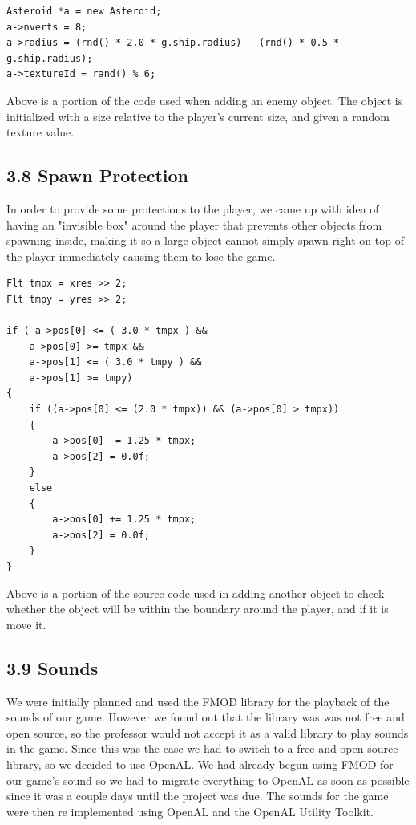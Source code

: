 \documentclass[12pt]{report}
\begin{document}
\begin{lstlisting}
Asteroid *a = new Asteroid;
a->nverts = 8;
a->radius = (rnd() * 2.0 * g.ship.radius) - (rnd() * 0.5 * g.ship.radius);
a->textureId = rand() % 6;
\end{lstlisting}

\noindent Above is a portion of the code used when adding an enemy object. The object is initialized with a size relative to the player's current size, and given a random texture value.

\newpage
\subsection*{3.8 Spawn Protection}
In order to provide some protections to the player, we came up with idea of having an "invisible box" around the player that prevents other objects from spawning inside, making it so a large object cannot simply spawn right on top of the player immediately causing them to lose the game. \bigskip

\begin{lstlisting}
Flt tmpx = xres >> 2;
Flt tmpy = yres >> 2;

if ( a->pos[0] <= ( 3.0 * tmpx ) &&
	a->pos[0] >= tmpx &&
	a->pos[1] <= ( 3.0 * tmpy ) &&
	a->pos[1] >= tmpy)
{
	if ((a->pos[0] <= (2.0 * tmpx)) && (a->pos[0] > tmpx))
	{
		a->pos[0] -= 1.25 * tmpx;
		a->pos[2] = 0.0f;
	}
	else
	{
		a->pos[0] += 1.25 * tmpx;
		a->pos[2] = 0.0f;
	}
}
\end{lstlisting}
\noindent Above is a portion of the source code used in adding another object to check whether the object will be within the boundary around the player, and if it is move it.

\newpage
\subsection*{3.9 Sounds}
We were initially planned and used the FMOD library for the playback of the sounds of our game. However we found out that the library was was not free and open source, so the professor would not accept it as a valid library to play sounds in the game. Since this was the case we had to switch to a free and open source library, so we decided to use OpenAL. We had already begun using FMOD for our game's sound so we had to migrate everything to OpenAL as soon as possible since it was a couple days until the project was due. The sounds for the game were then re implemented using OpenAL and the OpenAL Utility Toolkit. \bigskip
\end{document}

